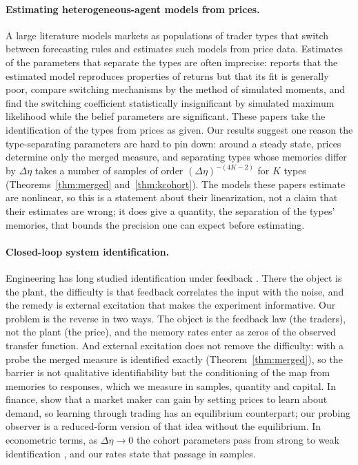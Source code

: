 \documentclass[12pt]{article}
\theoremstyle{definition}
\theoremstyle{remark}
\begin{document}
\paragraph{Estimating heterogeneous-agent models from prices.} A large literature models markets as populations of trader types that switch between forecasting rules \citep{brock1998} and estimates such models from price data. Estimates of the parameters that separate the types are often imprecise: \citet{amilon2008} reports that the estimated model reproduces properties of returns but that its fit is generally poor, \citet{franke2012} compare switching mechanisms by the method of simulated moments, and \citet{kukacka2017} find the switching coefficient statistically insignificant by simulated maximum likelihood while the belief parameters are significant. These papers take the identification of the types from prices as given. Our results suggest one reason the type-separating parameters are hard to pin down: around a steady state, prices determine only the merged measure, and separating types whose memories differ by $\Delta\eta$ takes a number of samples of order $(\Delta\eta)^{-(4K-2)}$ for $K$ types (Theorems~\ref{thm:merged} and~\ref{thm:kcohort}). The models these papers estimate are nonlinear, so this is a statement about their linearization, not a claim that their estimates are wrong; it does give a quantity, the separation of the types' memories, that bounds the precision one can expect before estimating.

\paragraph{Closed-loop system identification.} Engineering has long studied identification under feedback \citep{ljung1999,forssell1999}. There the object is the plant, the difficulty is that feedback correlates the input with the noise, and the remedy is external excitation that makes the experiment informative. Our problem is the reverse in two ways. The object is the feedback law (the traders), not the plant (the price), and the memory rates enter as zeros of the observed transfer function. And external excitation does not remove the difficulty: with a probe the merged measure is identified exactly (Theorem~\ref{thm:merged}), so the barrier is not qualitative identifiability but the conditioning of the map from memories to responses, which we measure in samples, quantity and capital. In finance, \citet{leach1993} show that a market maker can gain by setting prices to learn about demand, so learning through trading has an equilibrium counterpart; our probing observer is a reduced-form version of that idea without the equilibrium. In econometric terms, as $\Delta\eta\to0$ the cohort parameters pass from strong to weak identification \citep{andrews2012}, and our rates state that passage in samples.
\end{document}
